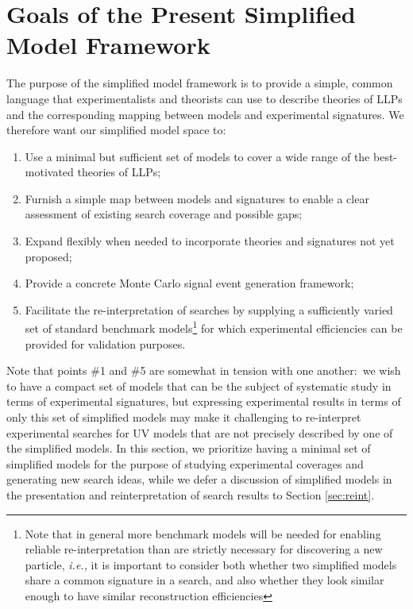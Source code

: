 \section{Goals of the Present Simplified Model Framework}\label{sec:goals}

The purpose of the simplified model framework is to provide a simple, common language that experimentalists and theorists can use to describe theories of LLPs and the corresponding mapping between models and experimental signatures. We therefore want our simplified model space to:
%
\begin{enumerate}
%
\item  Use a minimal but sufficient set of models to cover a wide range of the best-motivated theories of LLPs;
\item  Furnish a simple map between models and signatures to enable a clear assessment of existing search coverage and possible gaps; 
\item Expand flexibly when needed to incorporate theories and signatures not yet proposed;
\item Provide a concrete Monte Carlo signal event generation framework;
\item Facilitate the re-interpretation of searches by supplying a sufficiently varied set of standard benchmark models\footnote{Note that  in general more benchmark models will be needed for enabling reliable re-interpretation than are strictly necessary for discovering a new particle, \emph{i.e.,}  it is important to consider both whether two simplified models share a common signature in a search, and also whether they look similar enough to have similar reconstruction efficiencies} for which experimental efficiencies can be provided for validation purposes.
\end{enumerate}
%
Note that points \#1 and \#5 are somewhat in tension with one another:~we wish to have a compact set of models that can be the subject of systematic study in terms of experimental signatures, but expressing experimental results in terms of only this set of simplified models may make it challenging to re-interpret experimental searches for UV models that are not precisely described by one of the simplified models. In this section, we prioritize having a minimal set of simplified models for the purpose of studying experimental coverages and generating new search ideas, while we defer a discussion of simplified models in the presentation and reinterpretation of search results to Section \ref{sec:reint}.

